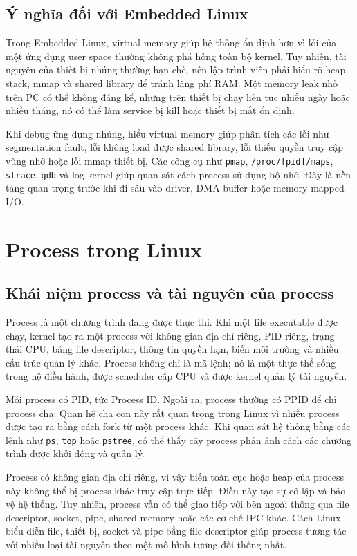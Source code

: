 \documentclass[11pt]{article}
\newcommand{\code}[1]{\texttt{#1}}
\begin{document}
\subsection{Ý nghĩa đối với Embedded Linux}

Trong Embedded Linux, virtual memory giúp hệ thống ổn định hơn vì lỗi của một ứng dụng user space thường không phá hỏng toàn bộ kernel. Tuy nhiên, tài nguyên của thiết bị nhúng thường hạn chế, nên lập trình viên phải hiểu rõ heap, stack, mmap và shared library để tránh lãng phí RAM. Một memory leak nhỏ trên PC có thể không đáng kể, nhưng trên thiết bị chạy liên tục nhiều ngày hoặc nhiều tháng, nó có thể làm service bị kill hoặc thiết bị mất ổn định.

Khi debug ứng dụng nhúng, hiểu virtual memory giúp phân tích các lỗi như segmentation fault, lỗi không load được shared library, lỗi thiếu quyền truy cập vùng nhớ hoặc lỗi mmap thiết bị. Các công cụ như \code{pmap}, \code{/proc/[pid]/maps}, \code{strace}, \code{gdb} và log kernel giúp quan sát cách process sử dụng bộ nhớ. Đây là nền tảng quan trọng trước khi đi sâu vào driver, DMA buffer hoặc memory mapped I/O.

\section{Process trong Linux}

\subsection{Khái niệm process và tài nguyên của process}

Process là một chương trình đang được thực thi. Khi một file executable được chạy, kernel tạo ra một process với không gian địa chỉ riêng, PID riêng, trạng thái CPU, bảng file descriptor, thông tin quyền hạn, biến môi trường và nhiều cấu trúc quản lý khác. Process không chỉ là mã lệnh; nó là một thực thể sống trong hệ điều hành, được scheduler cấp CPU và được kernel quản lý tài nguyên.

Mỗi process có PID, tức Process ID. Ngoài ra, process thường có PPID để chỉ process cha. Quan hệ cha con này rất quan trọng trong Linux vì nhiều process được tạo ra bằng cách fork từ một process khác. Khi quan sát hệ thống bằng các lệnh như \code{ps}, \code{top} hoặc \code{pstree}, có thể thấy cây process phản ánh cách các chương trình được khởi động và quản lý.

Process có không gian địa chỉ riêng, vì vậy biến toàn cục hoặc heap của process này không thể bị process khác truy cập trực tiếp. Điều này tạo sự cô lập và bảo vệ hệ thống. Tuy nhiên, process vẫn có thể giao tiếp với bên ngoài thông qua file descriptor, socket, pipe, shared memory hoặc các cơ chế IPC khác. Cách Linux biểu diễn file, thiết bị, socket và pipe bằng file descriptor giúp process tương tác với nhiều loại tài nguyên theo một mô hình tương đối thống nhất.
\end{document}
